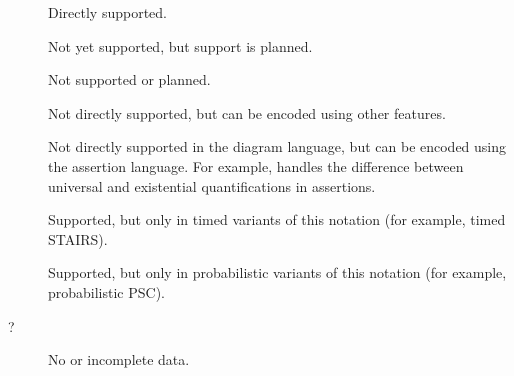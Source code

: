 \begin{description}
  \item[\OK] Directly supported.
  \item[\SOON] Not yet supported, but
  support is planned.
  \item[\NO] Not supported or planned.
  \item[\ISH] Not directly supported, but can be encoded using other
  features.
  \item[\ASST] Not directly supported in the
  diagram language, but can be encoded using the
  assertion language.  For example, \langname{} handles
  the difference between universal and existential
  quantifications in assertions.
  \item[\INTIMED] Supported, but only in timed variants of this
  notation (for example, timed STAIRS).
  \item[\INPROB] Supported, but only in
  probabilistic variants of this
  notation (for example, probabilistic PSC). 
  \item[?] No or incomplete data.
\end{description}

